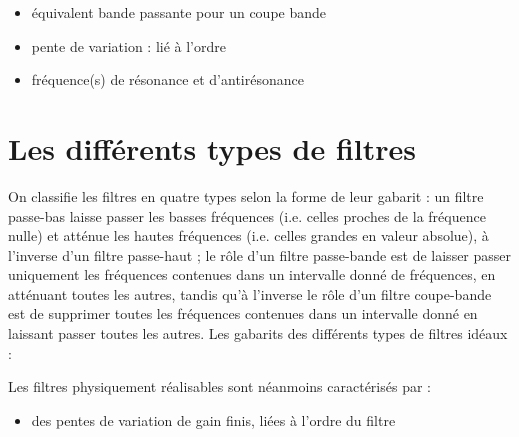 \documentclass[]{book}
\begin{document}
{\begin{itemize}
		La bande passante spécifie donc le domaine de fréquences à l’intérieur duquel le gain du filtre demeure plus ou moins constant, ou du moins ne chute pas de plus de 3 dB. Elle donne ainsi la plage de fréquences que le filtre va laisser passer, d’où son nom de bande passante ! La bande passante d’un filtre est constituée d’un ou plusieurs intervalles de $\mathbb{R}^{+}$, les bornes de ces intervalles étant données par les fréquences de coupure du filtre. Par exemple, la bande passante d’un filtre passe-bas est de la forme [0; fc] où fc est l’unique fréquence de coupure, tandis que la bande passante d’un filtre passe-haut est de la forme [fc;+1] ; la bande passante d’un filtre passe-bande classique (i.e. avec une seule bande passante) est de la forme [fc1; fc2] où fc1 et fc2 sont les deux fréquences de coupure, tandis que la bande passante d’un filtre coupe-bande classique (i.e. avec une seule bande coupée) est de la forme [0; fc1] [ [fc2;+1].
		\item équivalent bande passante pour un coupe bande
		\item pente de variation : lié à l'ordre
		\item fréquence(s) de résonance et d'antirésonance
		
	\end{itemize}
	
	
	\section{Les différents types de filtres}
	On classifie les filtres en quatre types selon la forme de leur gabarit : un filtre passe-bas laisse passer les basses fréquences (i.e. celles proches de la fréquence nulle) et atténue les hautes fréquences (i.e. celles grandes en valeur absolue), à l’inverse d’un filtre passe-haut ; le rôle d’un filtre passe-bande est de laisser passer uniquement les fréquences contenues dans un intervalle donné de fréquences, en atténuant toutes les autres, tandis qu’à l’inverse le rôle d’un filtre coupe-bande est de supprimer toutes les fréquences contenues dans un intervalle donné en laissant passer toutes les autres. Les gabarits des différents types de filtres idéaux :
	
	
	Les filtres physiquement réalisables sont néanmoins caractérisés par :
	\begin{itemize}
		\item des pentes de variation de gain finis, liées à l'ordre du filtre
	\end{itemize}
	
}
\end{document}
